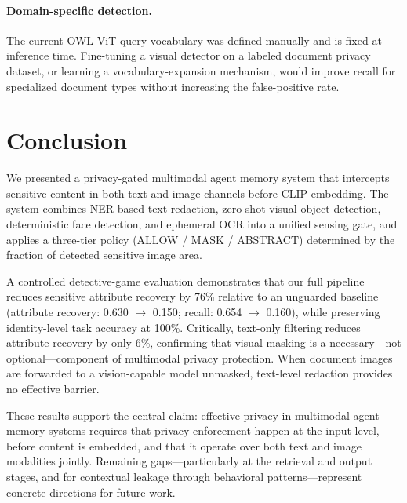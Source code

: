 \documentclass[11pt]{article}
\begin{document}
\paragraph{Domain-specific detection.} The current OWL-ViT query vocabulary was defined manually and is fixed at inference time. Fine-tuning a visual detector on a labeled document privacy dataset, or learning a vocabulary-expansion mechanism, would improve recall for specialized document types without increasing the false-positive rate.

\section{Conclusion}

We presented a privacy-gated multimodal agent memory system that intercepts sensitive content in both text and image channels before CLIP embedding. The system combines NER-based text redaction, zero-shot visual object detection, deterministic face detection, and ephemeral OCR into a unified sensing gate, and applies a three-tier policy (ALLOW / MASK / ABSTRACT) determined by the fraction of detected sensitive image area.

A controlled detective-game evaluation demonstrates that our full pipeline reduces sensitive attribute recovery by 76\% relative to an unguarded baseline (attribute recovery: 0.630 $\to$ 0.150; recall: 0.654 $\to$ 0.160), while preserving identity-level task accuracy at 100\%. Critically, text-only filtering reduces attribute recovery by only 6\%, confirming that visual masking is a necessary---not optional---component of multimodal privacy protection. When document images are forwarded to a vision-capable model unmasked, text-level redaction provides no effective barrier.

These results support the central claim: effective privacy in multimodal agent memory systems requires that privacy enforcement happen at the input level, before content is embedded, and that it operate over both text and image modalities jointly. Remaining gaps---particularly at the retrieval and output stages, and for contextual leakage through behavioral patterns---represent concrete directions for future work.
\end{document}
